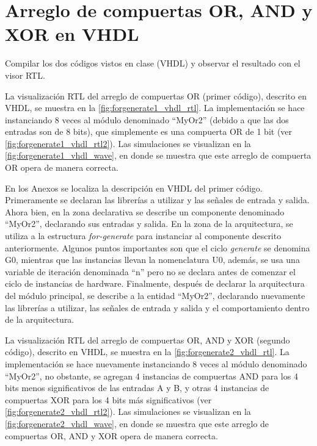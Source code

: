 \section{Arreglo de compuertas OR, AND y XOR en VHDL \label{sec:s1}}

\begin{center}
	\begin{minipage}{12cm}
		\begin{tcolorbox}[title=Actividad 1]
			Compilar los dos códigos vistos en clase (VHDL) y observar el resultado con el visor RTL.
		\end{tcolorbox}	
	\end{minipage}
\end{center}

La visualización RTL del arreglo de compuertas OR (primer código), descrito en VHDL, se muestra en la \autoref{fig:forgenerate1_vhdl_rtl}. La implementación se hace instanciando 8 veces al módulo denominado ``MyOr2'' (debido a que las dos entradas son de 8 bits), que simplemente es una compuerta OR de 1 bit (ver \autoref{fig:forgenerate1_vhdl_rtl2}). Las simulaciones se visualizan en la \autoref{fig:forgenerate1_vhdl_wave}, en donde se muestra que este arreglo de compuerta OR opera de manera correcta.

En los Anexos se localiza la descripción en VHDL del primer código. Primeramente se declaran las librerías a utilizar y las señales de entrada y salida. Ahora bien, en la zona declarativa se describe un componente denominado ``MyOr2'', declarando sus entradas y salida. En la zona de la arquitectura, se utiliza a la estructura \textit{for-generate} para instanciar al componente descrito anteriormente. Algunos puntos importantes son que el ciclo \textit{generate} se denomina G0, mientras que las instancias llevan la nomenclatura U0, además, se usa una variable de iteración denominada ``n'' pero no se declara antes de comenzar el ciclo de instancias de hardware. Finalmente, después de declarar la arquitectura del módulo principal, se describe a la entidad ``MyOr2'', declarando nuevamente las librerías a utilizar, las señales de entrada y salida y el comportamiento dentro de la arquitectura.

La visualización RTL del arreglo de compuertas OR, AND y XOR (segundo código), descrito en VHDL, se muestra en la \autoref{fig:forgenerate2_vhdl_rtl}. La implementación se hace nuevamente instanciando 8 veces al módulo denominado ``MyOr2'', no obstante, se agregan 4 instancias de compuertas AND para los 4 bits menos significativos de las entradas A y B, y otras 4 instancias de compuertas XOR para los 4 bits más significativos (ver \autoref{fig:forgenerate2_vhdl_rtl2}). Las simulaciones se visualizan en la \autoref{fig:forgenerate2_vhdl_wave}, en donde se muestra que este arreglo de compuertas OR, AND y XOR opera de manera correcta.

